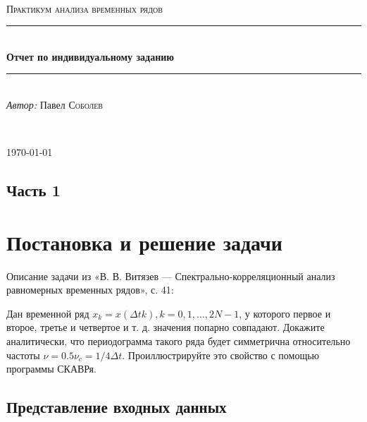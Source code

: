\documentclass[12pt]{article}
\begin{document}
\begin{titlepage}

    \newcommand{\HRule}{\rule{\linewidth}{0.5mm}}

    \center

    \ \\[6.5cm]

    \textsc{\Large Практикум анализа временных рядов}\\[0.5cm]

    \HRule\\[0.4cm]

    {\huge\bfseries Отчет по индивидуальному заданию}\\[0.4cm]

    \HRule\\[0.5cm]

    \large
    \textit{Автор:} Павел \textsc{Соболев}

    \ \\[0.9cm]
    \vfill\vfill\vfill

    {\large\today}

    \vfill

\end{titlepage}

\subsection*{Часть 1}
\section*{Постановка и решение задачи}
\setcounter{section}{1}

\vspace{18pt}

Описание задачи из «В. В. Витязев — Спектрально-корреляционный анализ равномерных временных рядов», с. 41: \par

\vspace{\baselineskip}

Дан временной ряд $ x_k = x\left(\Delta t k\right), k = 0, 1, \ldots, 2N - 1 $, у которого первое и второе, третье и четвертое и т. д. значения попарно совпадают. Докажите аналитически, что периодограмма такого ряда будет симметрична относительно частоты $ \nu = 0.5 \nu_c = 1/4 \Delta t $. Проиллюстрируйте это свойство с помощью программы СКАВРя.

\subsection{Представление входных данных}
\end{document}

